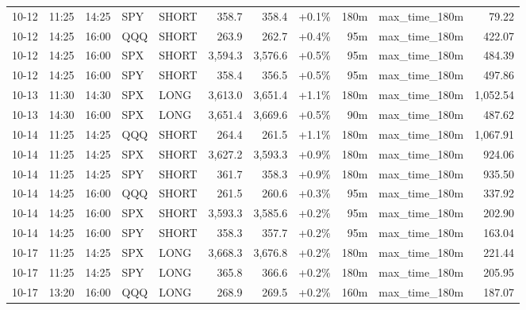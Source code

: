 \documentclass[11pt,a4paper,twoside]{article}
\begin{document}
\begin{center}
\begin{longtable}{>{\color{txtmain}}l l l l l r r r r >{\color{txtmain}}l r}
10-12 & 11:25 & 14:25 & SPY & SHORT & 358.7 & 358.4 & \textcolor{wingreen}{+0.1\%} & 180m & max\_time\_180m & \textcolor{wingreen}{79.22} \\
10-12 & 14:25 & 16:00 & QQQ & SHORT & 263.9 & 262.7 & \textcolor{wingreen}{+0.4\%} & 95m & max\_time\_180m & \textcolor{wingreen}{422.07} \\
10-12 & 14:25 & 16:00 & SPX & SHORT & 3,594.3 & 3,576.6 & \textcolor{wingreen}{+0.5\%} & 95m & max\_time\_180m & \textcolor{wingreen}{484.39} \\
10-12 & 14:25 & 16:00 & SPY & SHORT & 358.4 & 356.5 & \textcolor{wingreen}{+0.5\%} & 95m & max\_time\_180m & \textcolor{wingreen}{497.86} \\
10-13 & 11:30 & 14:30 & SPX & LONG & 3,613.0 & 3,651.4 & \textcolor{wingreen}{+1.1\%} & 180m & max\_time\_180m & \textcolor{wingreen}{1,052.54} \\
10-13 & 14:30 & 16:00 & SPX & LONG & 3,651.4 & 3,669.6 & \textcolor{wingreen}{+0.5\%} & 90m & max\_time\_180m & \textcolor{wingreen}{487.62} \\
10-14 & 11:25 & 14:25 & QQQ & SHORT & 264.4 & 261.5 & \textcolor{wingreen}{+1.1\%} & 180m & max\_time\_180m & \textcolor{wingreen}{1,067.91} \\
10-14 & 11:25 & 14:25 & SPX & SHORT & 3,627.2 & 3,593.3 & \textcolor{wingreen}{+0.9\%} & 180m & max\_time\_180m & \textcolor{wingreen}{924.06} \\
10-14 & 11:25 & 14:25 & SPY & SHORT & 361.7 & 358.3 & \textcolor{wingreen}{+0.9\%} & 180m & max\_time\_180m & \textcolor{wingreen}{935.50} \\
10-14 & 14:25 & 16:00 & QQQ & SHORT & 261.5 & 260.6 & \textcolor{wingreen}{+0.3\%} & 95m & max\_time\_180m & \textcolor{wingreen}{337.92} \\
10-14 & 14:25 & 16:00 & SPX & SHORT & 3,593.3 & 3,585.6 & \textcolor{wingreen}{+0.2\%} & 95m & max\_time\_180m & \textcolor{wingreen}{202.90} \\
10-14 & 14:25 & 16:00 & SPY & SHORT & 358.3 & 357.7 & \textcolor{wingreen}{+0.2\%} & 95m & max\_time\_180m & \textcolor{wingreen}{163.04} \\
10-17 & 11:25 & 14:25 & SPX & LONG & 3,668.3 & 3,676.8 & \textcolor{wingreen}{+0.2\%} & 180m & max\_time\_180m & \textcolor{wingreen}{221.44} \\
10-17 & 11:25 & 14:25 & SPY & LONG & 365.8 & 366.6 & \textcolor{wingreen}{+0.2\%} & 180m & max\_time\_180m & \textcolor{wingreen}{205.95} \\
10-17 & 13:20 & 16:00 & QQQ & LONG & 268.9 & 269.5 & \textcolor{wingreen}{+0.2\%} & 160m & max\_time\_180m & \textcolor{wingreen}{187.07} \\

\end{longtable}
\end{center}
\end{document}
